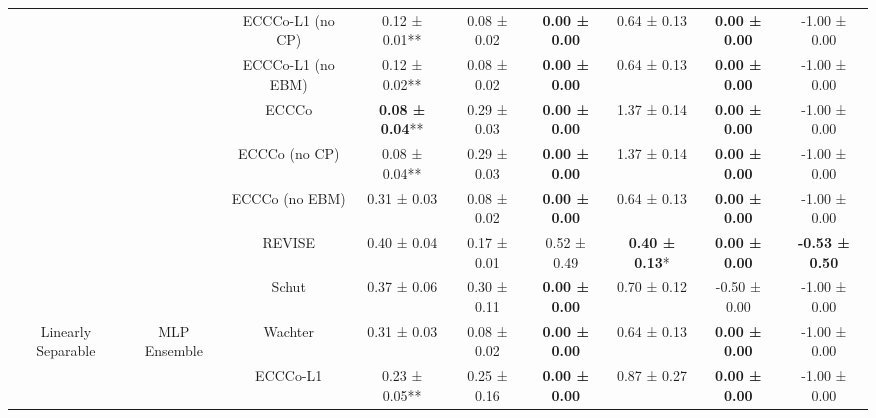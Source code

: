 \begin{longtable}[t]{ccccccccc}
 &  & ECCCo-L1 (no CP) & 0.12 ± 0.01** & 0.08 ± 0.02\hphantom{*}\hphantom{*} & \textbf{0.00 ± 0.00}\hphantom{*}\hphantom{*} & 0.64 ± 0.13\hphantom{*}\hphantom{*} & \textbf{0.00 ± 0.00}\hphantom{*}\hphantom{*} & -1.00 ± 0.00\hphantom{*}\hphantom{*}\\

 &  & ECCCo-L1 (no EBM) & 0.12 ± 0.02** & 0.08 ± 0.02\hphantom{*}\hphantom{*} & \textbf{0.00 ± 0.00}\hphantom{*}\hphantom{*} & 0.64 ± 0.13\hphantom{*}\hphantom{*} & \textbf{0.00 ± 0.00}\hphantom{*}\hphantom{*} & -1.00 ± 0.00\hphantom{*}\hphantom{*}\\

 &  & ECCCo & \textbf{0.08 ± 0.04}** & 0.29 ± 0.03\hphantom{*}\hphantom{*} & \textbf{0.00 ± 0.00}\hphantom{*}\hphantom{*} & 1.37 ± 0.14\hphantom{*}\hphantom{*} & \textbf{0.00 ± 0.00}\hphantom{*}\hphantom{*} & -1.00 ± 0.00\hphantom{*}\hphantom{*}\\

 &  & ECCCo (no CP) & 0.08 ± 0.04** & 0.29 ± 0.03\hphantom{*}\hphantom{*} & \textbf{0.00 ± 0.00}\hphantom{*}\hphantom{*} & 1.37 ± 0.14\hphantom{*}\hphantom{*} & \textbf{0.00 ± 0.00}\hphantom{*}\hphantom{*} & -1.00 ± 0.00\hphantom{*}\hphantom{*}\\

 &  & ECCCo (no EBM) & 0.31 ± 0.03\hphantom{*}\hphantom{*} & 0.08 ± 0.02\hphantom{*}\hphantom{*} & \textbf{0.00 ± 0.00}\hphantom{*}\hphantom{*} & 0.64 ± 0.13\hphantom{*}\hphantom{*} & \textbf{0.00 ± 0.00}\hphantom{*}\hphantom{*} & -1.00 ± 0.00\hphantom{*}\hphantom{*}\\

 &  & REVISE & 0.40 ± 0.04\hphantom{*}\hphantom{*} & 0.17 ± 0.01\hphantom{*}\hphantom{*} & 0.52 ± 0.49\hphantom{*}\hphantom{*} & \textbf{0.40 ± 0.13}*\hphantom{*} & \textbf{0.00 ± 0.00}\hphantom{*}\hphantom{*} & \textbf{-0.53 ± 0.50}\hphantom{*}\hphantom{*}\\

 &  & Schut & 0.37 ± 0.06\hphantom{*}\hphantom{*} & 0.30 ± 0.11\hphantom{*}\hphantom{*} & \textbf{0.00 ± 0.00}\hphantom{*}\hphantom{*} & 0.70 ± 0.12\hphantom{*}\hphantom{*} & -0.50 ± 0.00\hphantom{*}\hphantom{*} & -1.00 ± 0.00\hphantom{*}\hphantom{*}\\

\multirow[t]{-36}{*}{\centering\arraybackslash Linearly Separable} & \multirow[t]{-9}{*}{\centering\arraybackslash MLP Ensemble} & Wachter & 0.31 ± 0.03\hphantom{*}\hphantom{*} & 0.08 ± 0.02\hphantom{*}\hphantom{*} & \textbf{0.00 ± 0.00}\hphantom{*}\hphantom{*} & 0.64 ± 0.13\hphantom{*}\hphantom{*} & \textbf{0.00 ± 0.00}\hphantom{*}\hphantom{*} & -1.00 ± 0.00\hphantom{*}\hphantom{*}\\
\cmidrule{1-9}
 &  & ECCCo-L1 & 0.23 ± 0.05** & 0.25 ± 0.16\hphantom{*}\hphantom{*} & \textbf{0.00 ± 0.00}\hphantom{*}\hphantom{*} & 0.87 ± 0.27\hphantom{*}\hphantom{*} & \textbf{0.00 ± 0.00}\hphantom{*}\hphantom{*} & -1.00 ± 0.00\hphantom{*}\hphantom{*}\\


\end{longtable}
